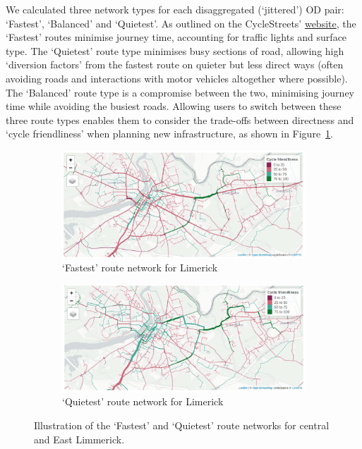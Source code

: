 \documentclass[
  super,
  preprint,
  3p]{elsarticle}
\begin{document}
We calculated three network types for each disaggregated (`jittered') OD
pair: `Fastest', `Balanced' and `Quietest'. As outlined on the
CycleStreets'
\href{https://www.cyclestreets.net/help/journey/howitworks/}{website},
the `Fastest' routes minimise journey time, accounting for traffic
lights and surface type. The `Quietest' route type minimises busy
sections of road, allowing high `diversion factors' from the fastest
route on quieter but less direct ways (often avoiding roads and
interactions with motor vehicles altogether where possible). The
`Balanced' route type is a compromise between the two, minimising
journey time while avoiding the busiest roads. Allowing users to switch
between these three route types enables them to consider the trade-offs
between directness and `cycle friendliness' when planning new
infrastructure, as shown in Figure~\ref{fig-route-types}.

\begin{figure}

{\centering 

\begin{figure}

{\centering \includegraphics{images/paste-5.png}

}

\caption{`Fastest' route network for Limerick}

\end{figure}

\begin{figure}

{\centering \includegraphics{images/paste-6.png}

}

\caption{`Quietest' route network for Limerick}

\end{figure}

}

\caption{\label{fig-route-types}Illustration of the `Fastest' and
`Quietest' route networks for central and East Limmerick.}

\end{figure}
\end{document}

